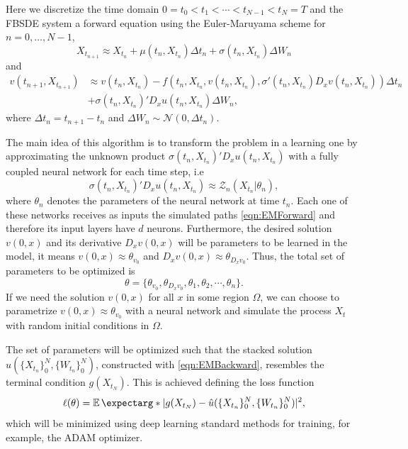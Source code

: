Here we discretize the time domain $0=t_0<t_1<\cdots <t_{N-1}<t_N=T$ and the FBSDE system a  forward equation using the Euler-Maruyama scheme for $n=0,\ldots,N-1$,
\begin{equation}
	\label{eqn:EMForward}
	X_{t_{n+1}} \approx X_{t_n} +\mu\left(t_n, X_{t_n}\right) \Delta t_n+\sigma\left(t_n, X_{t_n}\right) \Delta W_n
\end{equation}
and 
\begin{equation}
	\label{eqn:EMBackward}
	\begin{aligned}
		 v\left(t_{n+1}, X_{t_{n+1}}\right)
		&\approx  v\left(t_n, X_{t_n}\right) -f\left(t_n, X_{t_n}, v\left(t_n, X_{t_n}\right), \sigma'\left(t_n, X_{t_n}\right) D_x v\left(t_n, X_{t_n}\right)\right) \Delta t_n \\
		& +\sigma\left(t_n, X_{t_n}\right)'D_x u\left(t_n, X_{t_n}\right)  \Delta W_n,
	\end{aligned}
\end{equation}
where $\Delta t_n=t_{n+1}-t_{n}$ and $\Delta W_n\sim \mathcal{N}(0,\Delta t_n)$.

The main idea of this algorithm is to transform the problem in a learning one by approximating the unknown product $\sigma\left(t_n, X_{t_n}\right)'D_x u\left(t_n, X_{t_n}\right)$ with a fully coupled neural network for each time step, i.e
\begin{equation}
	\sigma\left(t_n, X_{t_n}\right)'D_x u\left(t_n, X_{t_n}\right) \approx \mathcal{Z}_n(X_{t_n}|\theta_n),
\end{equation}
where $\theta_n$ denotes the parameters of the neural network at time $t_n$. Each one of these networks receives as inputs the simulated paths \eqref{eqn:EMForward} and therefore its input layers have $d$ neurons.   Furthermore, the desired solution $v(0,x)$ and its derivative $D_x v(0,x)$  will be parameters to be learned in the model, it means $v(0,x)\approx \theta_{v_0}$ and $D_x v(0,x)\approx \theta_{D_x v_0}$. Thus, the total set of parameters to be optimized is 
\begin{equation}
	\theta=\{\theta_{v_0}, \theta_{D_x v_0},\theta_1,\theta_2,\cdots,\theta_n \}.
\end{equation}
If we need the solution $v(0,x)$ for all $x$ in some region $\Omega$, we can choose to parametrize $v(0,x)\approx \theta_{v_0}$ with a neural network and simulate the process $X_t$ with random initial conditions in $\Omega$.

The set of parameters will be optimized such that the stacked solution $\hat{u}(\{X_{t_n}\}_{0}^{N},\{W_{t_n}\}_{0}^{N})$, constructed with \eqref{eqn:EMBackward}, resembles the terminal condition $g(X_{t_N})$. This is achieved defining the loss function 
\begin{equation}
	\label{eqn:lossDeepBSDE}
	\ell(\theta)=\expect*{|g(X_{t_N})-\hat{u}(\{X_{t_n}\}_{0}^N,\{W_{t_n}\}_{0}^N)|^2},
\end{equation}
which will be minimized using deep learning standard methods for training, for example, the ADAM optimizer.

